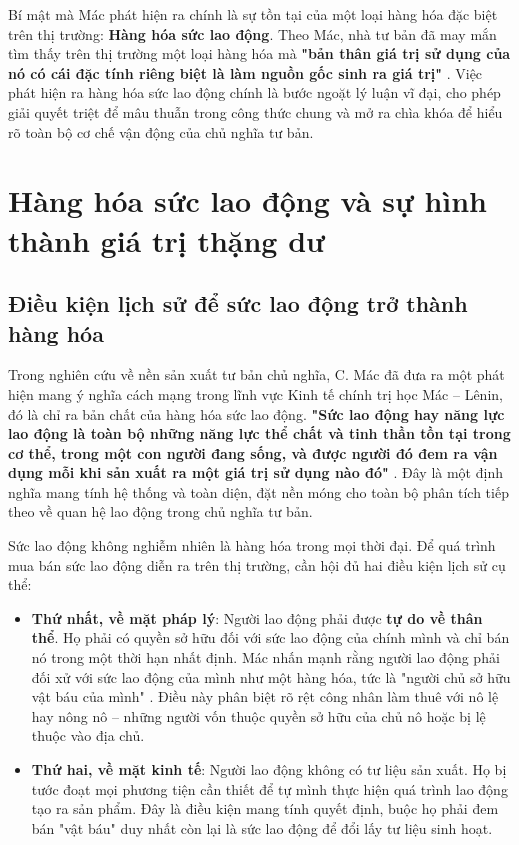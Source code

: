 Bí mật mà Mác phát hiện ra chính là sự tồn tại của một loại hàng hóa đặc biệt trên thị trường: \textbf{Hàng hóa sức lao động}. Theo Mác, nhà tư bản đã may mắn tìm thấy trên thị trường một loại hàng hóa mà \textbf{"bản thân giá trị sử dụng của nó có cái đặc tính riêng biệt là làm nguồn gốc sinh ra giá trị"} \cite[trang 277]{marx_engels_23}. Việc phát hiện ra hàng hóa sức lao động chính là bước ngoặt lý luận vĩ đại, cho phép giải quyết triệt để mâu thuẫn trong công thức chung và mở ra chìa khóa để hiểu rõ toàn bộ cơ chế vận động của chủ nghĩa tư bản.

\section{Hàng hóa sức lao động và sự hình thành giá trị thặng dư}
\subsection{Điều kiện lịch sử để sức lao động trở thành hàng hóa}
Trong nghiên cứu về nền sản xuất tư bản chủ nghĩa, C. Mác đã đưa ra một phát hiện mang ý nghĩa cách mạng trong lĩnh vực Kinh tế chính trị học Mác – Lênin, đó là chỉ ra bản chất của hàng hóa sức lao động. \textbf{"Sức lao động hay năng lực lao động là toàn bộ những năng lực thể chất và tinh thần tồn tại trong cơ thể, trong một con người đang sống, và được người đó đem ra vận dụng mỗi khi sản xuất ra một giá trị sử dụng nào đó"} \cite[trang 277]{marx_engels_23}. Đây là một định nghĩa mang tính hệ thống và toàn diện, đặt nền móng cho toàn bộ phân tích tiếp theo về quan hệ lao động trong chủ nghĩa tư bản.

Sức lao động không nghiễm nhiên là hàng hóa trong mọi thời đại. Để quá trình mua bán sức lao động diễn ra trên thị trường, cần hội đủ hai điều kiện lịch sử cụ thể:
\begin{itemize}
    \item \textbf{Thứ nhất, về mặt pháp lý}: Người lao động phải được \textbf{tự do về thân thể}. Họ phải có quyền sở hữu đối với sức lao động của chính mình và chỉ bán nó trong một thời hạn nhất định. Mác nhấn mạnh rằng người lao động phải đối xử với sức lao động của mình như một hàng hóa, tức là "người chủ sở hữu vật báu của mình" \cite[trang 278]{marx_engels_23}. Điều này phân biệt rõ rệt công nhân làm thuê với nô lệ hay nông nô – những người vốn thuộc quyền sở hữu của chủ nô hoặc bị lệ thuộc vào địa chủ.
    \item \textbf{Thứ hai, về mặt kinh tế}: Người lao động không có tư liệu sản xuất. Họ bị tước đoạt mọi phương tiện cần thiết để tự mình thực hiện quá trình lao động tạo ra sản phẩm. Đây là điều kiện mang tính quyết định, buộc họ phải đem bán "vật báu" duy nhất còn lại là sức lao động để đổi lấy tư liệu sinh hoạt.
\end{itemize}

